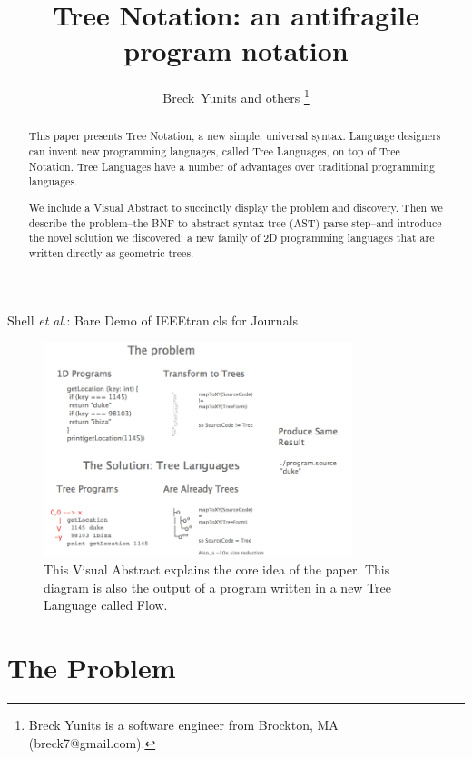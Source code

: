 \documentclass[journal]{IEEEtran}
\begin{document}
\title{Tree Notation: an antifragile program notation}

\author{Breck~Yunits and others%
\thanks{Breck Yunits is a software engineer from Brockton, MA (breck7@gmail.com).}%
}

%
{Shell \MakeLowercase{\textit{et al.}}: Bare Demo of IEEEtran.cls for Journals}

\maketitle


\begin{abstract}
This paper presents Tree Notation, a new simple, universal syntax. Language designers can invent new programming languages, called Tree Languages, on top of Tree Notation. Tree Languages have a number of advantages over traditional programming languages.

We include a Visual Abstract to succinctly display the problem and discovery. Then we describe the problem--the BNF to abstract syntax tree (AST) parse step--and introduce the novel solution we discovered: a new family of 2D programming languages that are written directly as geometric trees.
\end{abstract}

\IEEEpeerreviewmaketitle

\begin{figure}[ht!]
\centering
\includegraphics[width=90mm]{treenotation.png}
\caption{This Visual Abstract explains the core idea of the paper. This diagram is also the output of a program written in a new Tree Language called Flow.}
\end{figure}

\section{The Problem}
\end{document}
